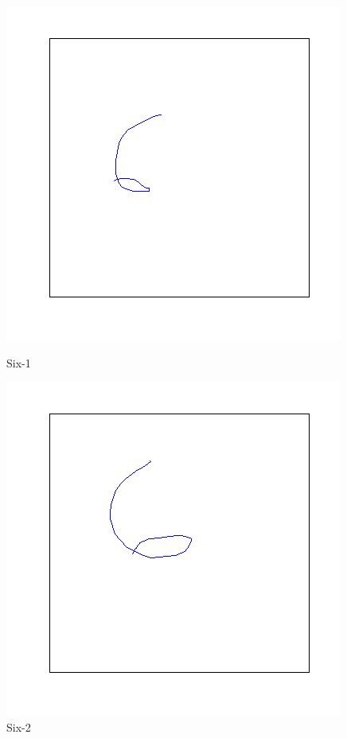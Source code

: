 \documentclass[a4paper, 10pt]{article}
\begin{document}
\begin{figure}[ht]
\begin{minipage}[b]{0.45\linewidth}
\centering
\includegraphics[width=\textwidth]{figs/6-1}
\caption{Six-1}
\label{fig:figure1}
\end{minipage}
\hspace{0.5cm}
\begin{minipage}[b]{0.45\linewidth}
\centering
\includegraphics[width=\textwidth]{figs/6-2}
\caption{Six-2}
\label{fig:figure2}
\end{minipage}
\end{figure}
\end{document}
